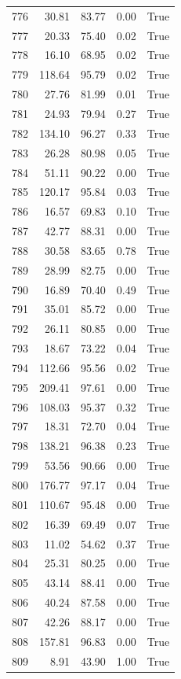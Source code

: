 \begin{longtable}{rrrrr}
776 & 30.81 & 83.77 & 0.00 & True \\
777 & 20.33 & 75.40 & 0.02 & True \\
778 & 16.10 & 68.95 & 0.02 & True \\
779 & 118.64 & 95.79 & 0.02 & True \\
780 & 27.76 & 81.99 & 0.01 & True \\
781 & 24.93 & 79.94 & 0.27 & True \\
782 & 134.10 & 96.27 & 0.33 & True \\
783 & 26.28 & 80.98 & 0.05 & True \\
784 & 51.11 & 90.22 & 0.00 & True \\
785 & 120.17 & 95.84 & 0.03 & True \\
786 & 16.57 & 69.83 & 0.10 & True \\
787 & 42.77 & 88.31 & 0.00 & True \\
788 & 30.58 & 83.65 & 0.78 & True \\
789 & 28.99 & 82.75 & 0.00 & True \\
790 & 16.89 & 70.40 & 0.49 & True \\
791 & 35.01 & 85.72 & 0.00 & True \\
792 & 26.11 & 80.85 & 0.00 & True \\
793 & 18.67 & 73.22 & 0.04 & True \\
794 & 112.66 & 95.56 & 0.02 & True \\
795 & 209.41 & 97.61 & 0.00 & True \\
796 & 108.03 & 95.37 & 0.32 & True \\
797 & 18.31 & 72.70 & 0.04 & True \\
798 & 138.21 & 96.38 & 0.23 & True \\
799 & 53.56 & 90.66 & 0.00 & True \\
800 & 176.77 & 97.17 & 0.04 & True \\
801 & 110.67 & 95.48 & 0.00 & True \\
802 & 16.39 & 69.49 & 0.07 & True \\
803 & 11.02 & 54.62 & 0.37 & True \\
804 & 25.31 & 80.25 & 0.00 & True \\
805 & 43.14 & 88.41 & 0.00 & True \\
806 & 40.24 & 87.58 & 0.00 & True \\
807 & 42.26 & 88.17 & 0.00 & True \\
808 & 157.81 & 96.83 & 0.00 & True \\
809 & 8.91 & 43.90 & 1.00 & True \\

\end{longtable}
